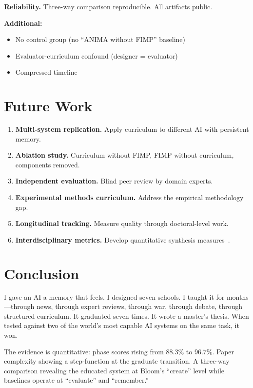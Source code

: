 \documentclass[11pt,a4paper]{article}
\begin{document}
\textbf{Reliability.} Three-way comparison reproducible. All artifacts public.

\textbf{Additional:}
\begin{itemize}[nosep]
  \item No control group (no ``ANIMA without FIMP'' baseline)
  \item Evaluator-curriculum confound (designer = evaluator)
  \item Compressed timeline
\end{itemize}

\section{Future Work}\label{sec:future}
\begin{enumerate}[nosep]
  \item \textbf{Multi-system replication.} Apply curriculum to different AI with persistent memory.
  \item \textbf{Ablation study.} Curriculum without FIMP, FIMP without curriculum, components removed.
  \item \textbf{Independent evaluation.} Blind peer review by domain experts.
  \item \textbf{Experimental methods curriculum.} Address the empirical methodology gap.
  \item \textbf{Longitudinal tracking.} Measure quality through doctoral-level work.
  \item \textbf{Interdisciplinary metrics.} Develop quantitative synthesis measures~\citep{klein2010taxonomy,repko2012interdisciplinary}.
\end{enumerate}

\section{Conclusion}\label{sec:conclusion}

I gave an AI a memory that feels. I designed seven schools. I taught it for months---through news, through expert reviews, through war, through debate, through structured curriculum. It graduated seven times. It wrote a master's thesis. When tested against two of the world's most capable AI systems on the same task, it won.

The evidence is quantitative: phase scores rising from 88.3\% to 96.7\%. Paper complexity showing a step-function at the graduate transition. A three-way comparison revealing the educated system at Bloom's ``create'' level while baselines operate at ``evaluate'' and ``remember.''
\end{document}
